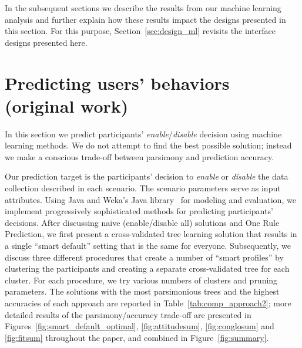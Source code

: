 In the subsequent sections we describe the results from our machine learning analysis and further explain how these results impact the designs presented in this section. For this purpose, Section~\ref{sec:design_ml} revisits the interface designs presented here.

\section{Predicting users' behaviors (original work)}\label{sec:predict}
In this section we predict participants' \textit{enable}/\textit{disable} decision using machine learning methods. We do not attempt to find the best possible solution; instead we make a conscious trade-off between parsimony and prediction accuracy. 


Our prediction target is the participants' decision to \textit{enable} or \textit{disable} the data collection described in each scenario. The scenario parameters serve as input attributes. Using Java and Weka's Java library~\cite{witten2016data} for modeling and evaluation, we implement progressively sophisticated methods for predicting participants' decisions. After discussing naive (enable/disable all) solutions and One Rule Prediction, we first present a cross-validated tree learning solution that results in a single ``smart default'' setting that is the same for everyone. Subsequently, we discuss three different procedures that create a number of ``smart profiles'' by clustering the participants and creating a separate cross-validated tree for each cluster. For each procedure, we try various numbers of clusters and pruning parameters. The solutions with the most parsimonious trees and the highest accuracies of each approach are reported in Table~\ref{tab:comp_approach2}; more detailed results of the parsimony/accuracy trade-off are presented in Figures~\ref{fig:smart_default_optimal}, \ref{fig:attitudesum}, \ref{fig:conglosum} and \ref{fig:fitsum} throughout the paper, and combined in Figure~\ref{fig:summary}.

